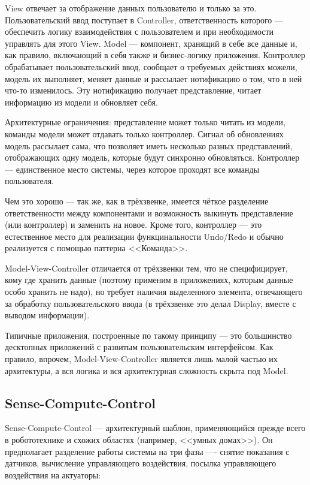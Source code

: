 \documentclass[a5paper]{article}
\begin{document}
View отвечает за отображение данных пользователю и только за это. Пользовательский ввод поступает в Controller, ответственность которого --- обеспечить логику взаимодействия с пользователем и при необходимости управлять для этого View. Model --- компонент, хранящий в себе все данные и, как правило, включающий в себя также и бизнес-логику приложения. Контроллер обрабатывает пользовательский ввод, сообщает о требуемых действиях можели, модель их выполняет, меняет данные и рассылает нотификацию о том, что в ней что-то изменилось. Эту нотификацию получает представление, читает информацию из модели и обновляет себя.

Архитектурные ограничения: представление может только читать из модели, команды модели может отдавать только контроллер. Сигнал об обновлениях модель рассылает сама, что позволяет иметь несколько разных представлений, отображающих одну модель, которые будут синхронно обновляться. Контроллер --- единственное место системы, через которое проходят все команды пользователя.

Чем это хорошо --- так же, как в трёхзвенке, имеется чёткое разделение ответственности между компонентами и возможность выкинуть представление (или контроллер) и заменить на новое. Кроме того, контроллер --- это естественное место для реализации функцинальности Undo/Redo и обычно реализуется с помощью паттерна <<Команда>>. 

Model-View-Controller отличается от трёхзвенки тем, что не специфицирует, кому где хранить данные (поэтому применим в приложениях, которым данные особо хранить не надо), но требует наличия выделенного элемента, отвечающего за обработку пользовательского ввода (в трёхзвенке это делал Display, вместе с выводом информации).

Типичные приложения, построенные по такому принципу --- это большинство десктопных приложений с развитым пользовательским интерфейсом. Как правило, впрочем, Model-View-Controller является лишь малой частью их архитектуры, а вся логика и вся архитектурная сложность скрыта под Model.

\subsection{Sense-Compute-Control}

Sense-Compute-Control --- архитектурный шаблон, применяющийся прежде всего в робототехнике и схожих областях (например, <<умных домах>>). Он предполагает разделение работы системы на три фазы ---- снятие показания с датчиков, вычисление управляющего воздействия, посылка управляющего воздействия на актуаторы:
\end{document}
